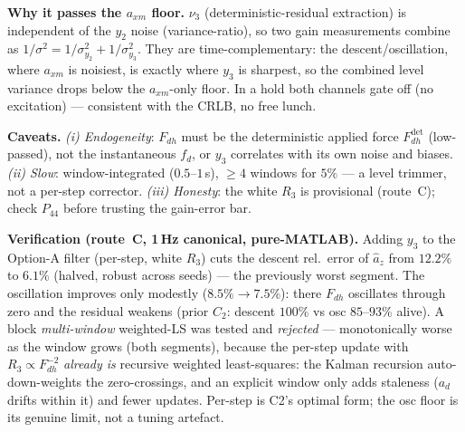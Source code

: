\documentclass[11pt,a4paper,fontset=none]{ctexart}
\begin{document}
\textbf{Why it passes the $a_{xm}$ floor.} $\nu_3$ (deterministic-residual
extraction) is independent of the $y_2$ noise (variance-ratio), so two gain
measurements combine as $1/\sigma^2=1/\sigma^2_{y_2}+1/\sigma^2_{y_3}$. They are
time-complementary: the descent/oscillation, where $a_{xm}$ is noisiest, is exactly
where $y_3$ is sharpest, so the combined level variance drops below the
$a_{xm}$-only floor. In a hold both channels gate off (no excitation) --- consistent
with the CRLB, no free lunch.

\textbf{Caveats.} \emph{(i) Endogeneity}: $F_{dh}$ must be the deterministic applied
force $F_{dh}^{\det}$ (low-passed), not the instantaneous $f_d$, or $y_3$ correlates
with its own noise and biases. \emph{(ii) Slow}: window-integrated ($0.5$--$1$\,s),
$\ge4$ windows for $5\%$ --- a level trimmer, not a per-step corrector.
\emph{(iii) Honesty}: the white $R_3$ is provisional (route~C); check $P_{44}$ before
trusting the gain-error bar.

\textbf{Verification (route~C, 1\,Hz canonical, pure-MATLAB).} Adding $y_3$ to the
Option-A filter (per-step, white $R_3$) cuts the descent rel.\ error of $\hat a_z$
from $12.2\%$ to $6.1\%$ (halved, robust across seeds) --- the previously worst
segment. The oscillation improves only modestly ($8.5\%\!\to\!7.5\%$): there $F_{dh}$
oscillates through zero and the residual weakens (prior $C_2$: descent $100\%$ vs osc
$85$--$93\%$ alive). A block \emph{multi-window} weighted-LS was tested and
\emph{rejected} --- monotonically worse as the window grows (both segments), because
the per-step update with $R_3\propto F_{dh}^{-2}$ \emph{already is} recursive weighted
least-squares: the Kalman recursion auto-down-weights the zero-crossings, and an
explicit window only adds staleness ($a_d$ drifts within it) and fewer updates.
Per-step is C2's optimal form; the osc floor is its genuine limit, not a tuning
artefact.
\end{document}
